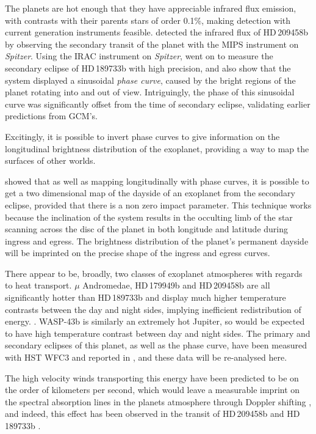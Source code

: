 \documentclass[a4paper,fleqn,usenatbib]{mnras}
\begin{document}
The planets are hot enough that they have appreciable infrared flux emission, with contrasts with their parents stars of order 0.1\%, making detection with current generation instruments feasible. \citet{Deming2005} detected the infrared flux of HD\,209458b by observing the secondary transit of the planet with the MIPS instrument on \emph{Spitzer}. Using the IRAC instrument on \emph{Spitzer}, \citet{Knutson2007b} went on to measure the secondary eclipse of HD\,189733b with high precision, and also show that the system displayed a sinusoidal \emph{phase curve}, caused by the bright regions of the planet rotating into and out of view. Intriguingly, the phase of this sinusoidal curve was significantly offset from the time of secondary eclipse, validating earlier predictions from GCM's.

Excitingly, it is possible to invert phase curves to give information on the longitudinal brightness distribution of the exoplanet, providing a way to map the surfaces of other worlds. 

\cite{Majeau2012} showed that as well as mapping longitudinally with phase curves, it is possible to get a two dimensional map of the dayside of an exoplanet from the secondary eclipse, provided that there is a non zero impact parameter. This technique works because the inclination of the system results in the occulting limb of the star scanning across the disc of the planet in both longitude and latitude during ingress and egress. The brightness distribution of the planet's permanent dayside will be imprinted on the precise shape of the ingress and egress curves.

There appear to be, broadly, two classes of exoplanet atmospheres with regards to heat transport. $\mu$ Andromedae, HD\,179949b and HD\,209458b are all significantly hotter than HD\,189733b and display much higher temperature contrasts between the day and night sides, implying inefficient redistribution of energy. \citep{Harrington2006,Cowan2007,zellem2014}. WASP-43b is similarly an extremely hot Jupiter, so would be expected to have high temperature contrast between day and night sides. The primary and secondary eclipses of this planet, as well as the phase curve, have been measured with HST WFC3 and reported in \citep{Stevenson2014}, and these data will be re-analysed here.

The high velocity winds transporting this energy have been predicted to be on the order of kilometers per second, which would leave a measurable imprint on the spectral absorption lines in the planets atmosphere through Doppler shifting \citep[e.g.][]{Showman2013}, and indeed, this effect has been observed in the transit of HD\,209458b \citep{Snellen2010} and HD\,189733b \citep{Louden2015}. 
\end{document}
